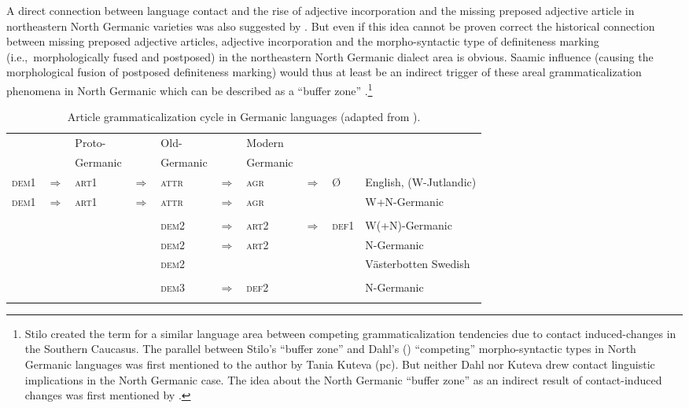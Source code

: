 {A direct connection between language contact and the rise of adjective incorporation and the missing preposed adjective article in northeastern North Germanic varieties was also suggested by \cite{riesler2001a,riesler2002a}. But even if this idea cannot be proven correct the historical connection between missing preposed adjective articles, adjective incorporation and the morpho-syntactic type of definiteness marking (i.e.,~morphologically fused and postposed) in the northeastern North Germanic dialect area is obvious. Saamic influence (causing the morphological fusion of postposed definiteness marking) would thus at least be an indirect trigger of these areal grammaticalization phenomena in North Germanic which can be described as a “buffer zone” \citep{stilo2005}.\footnote{Stilo created the term for a similar language area between competing grammaticalization tendencies due to contact induced-changes in the Southern Caucasus. The parallel between Stilo's “buffer zone” and Dahl's (\citeyear{dahl2003}) “competing” morpho-syntactic types in North Germanic languages was first mentioned to the author by Tania Kuteva (pc). But neither Dahl nor Kuteva drew contact linguistic implications in the North Germanic case. The idea about the North Germanic “buffer zone” as an indirect result of contact-induced changes was first mentioned by \cite{riesler2006a}.}

\begin{sidewaystable}
\begin{tabular}[t]{l l l l l l l l l l}
\lsptoprule
&	&Proto\hyp{}& &Old-&	&Modern&&\\
&	&Germanic&	&Germanic&	&Germanic&&\\
\midrule
\textsc{dem1}&$\Rightarrow$&\textsc{art1}&$\Rightarrow$&\textsc{attr}&$\Rightarrow$&\textsc{agr}&$\Rightarrow$&Ø&English, (W-Jutlandic)\\
\textsc{dem1}&$\Rightarrow$&\textsc{art1}&$\Rightarrow$&\textsc{attr}&$\Rightarrow$&\textsc{agr}&&&W+N-Germanic\\
\\
&&&		&\textsc{dem2}&$\Rightarrow$&\textsc{art2}&$\Rightarrow$&\textsc{def1}&W(+N)-Germanic\\
&&&		&\textsc{dem2}&$\Rightarrow$&\textsc{art2}&&&N-Germanic\\
&&&		&\textsc{dem2}&&&&&Västerbotten Swedish\\
\\
&&&		&\textsc{dem3}&$\Rightarrow$&\textsc{def2}&&&N-Germanic\\
\lspbottomrule
\end{tabular}
\caption[Article grammaticalization cycle in Germanic]{Article grammaticalization cycle in Germanic languages (adapted from \citealt[272]{riesler2006a}).}
\end{sidewaystable}

}
